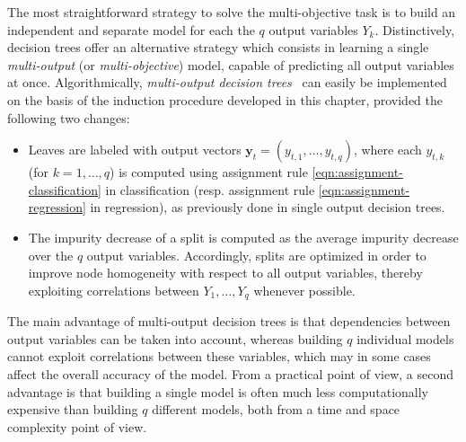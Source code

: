 The most straightforward strategy to solve the multi-objective task is to build
an independent and separate model for each the $q$ output variables $Y_k$.
Distinctively, decision trees offer an alternative strategy which consists in
learning a single \textit{multi-output} (or \textit{multi-objective}) model,
capable of predicting all output variables at once. Algorithmically,  \textit
{multi-output decision trees}~\citep{dumont:2007,kocev:2007} can easily be
implemented on the basis of the induction procedure developed in this chapter,
provided the following two changes:
\begin{itemize}
\item Leaves are labeled with output vectors $\mathbf{y}_t = (y_{t,1}, \dots, y_{t,q})$,
      where each $y_{t,k}$ (for $k=1,\dots,q$) is computed using assignment rule
      \ref{eqn:assignment-classification} in classification (resp. assignment
      rule \ref{eqn:assignment-regression} in regression), as previously
      done in single output decision trees.

\item The impurity decrease of a split is computed as the average impurity decrease
      over the $q$ output variables. Accordingly, splits are optimized
      in order to improve node homogeneity with respect to all output variables,
      thereby exploiting correlations between $Y_1, \dots, Y_q$ whenever possible.

\end{itemize}

The main advantage of multi-output decision trees is that dependencies between
output variables can be taken into account, whereas building $q$ individual
models cannot exploit correlations between these variables, which may in some
cases affect the overall accuracy of the model. From a practical point of view,
a second advantage is that building a single model is often much less
computationally expensive than building $q$ different models, both from a time
and space complexity point of view.
